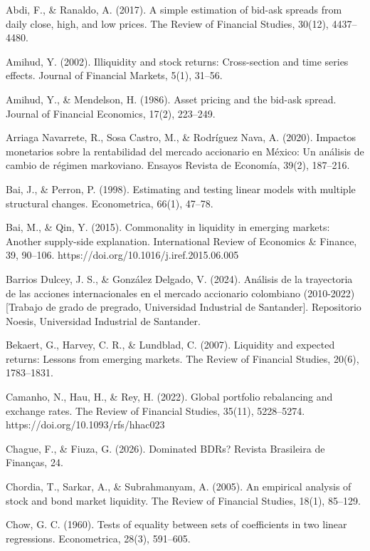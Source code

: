 \begin{referencias}

Abdi, F., \& Ranaldo, A. (2017). A simple estimation of bid-ask spreads from daily close, high, and low prices. The Review of Financial Studies, 30(12), 4437--4480.

Amihud, Y. (2002). Illiquidity and stock returns: Cross-section and time series effects. Journal of Financial Markets, 5(1), 31--56.

Amihud, Y., \& Mendelson, H. (1986). Asset pricing and the bid-ask spread. Journal of Financial Economics, 17(2), 223--249.

Arriaga Navarrete, R., Sosa Castro, M., \& Rodríguez Nava, A. (2020). Impactos monetarios sobre la rentabilidad del mercado accionario en México: Un análisis de cambio de régimen markoviano. Ensayos Revista de Economía, 39(2), 187--216.

Bai, J., \& Perron, P. (1998). Estimating and testing linear models with multiple structural changes. Econometrica, 66(1), 47--78.

Bai, M., \& Qin, Y. (2015). Commonality in liquidity in emerging markets: Another supply-side explanation. International Review of Economics \& Finance, 39, 90--106. https://doi.org/10.1016/j.iref.2015.06.005

Barrios Dulcey, J. S., \& González Delgado, V. (2024). Análisis de la trayectoria de las acciones internacionales en el mercado accionario colombiano (2010-2022) {[}Trabajo de grado de pregrado, Universidad Industrial de Santander{]}. Repositorio Noesis, Universidad Industrial de Santander.

Bekaert, G., Harvey, C. R., \& Lundblad, C. (2007). Liquidity and expected returns: Lessons from emerging markets. The Review of Financial Studies, 20(6), 1783--1831.

Camanho, N., Hau, H., \& Rey, H. (2022). Global portfolio rebalancing and exchange rates. The Review of Financial Studies, 35(11), 5228--5274. https://doi.org/10.1093/rfs/hhac023

Chague, F., \& Fiuza, G. (2026). Dominated BDRs? Revista Brasileira de Finanças, 24.

Chordia, T., Sarkar, A., \& Subrahmanyam, A. (2005). An empirical analysis of stock and bond market liquidity. The Review of Financial Studies, 18(1), 85--129.

Chow, G. C. (1960). Tests of equality between sets of coefficients in two linear regressions. Econometrica, 28(3), 591--605.


\end{referencias}
